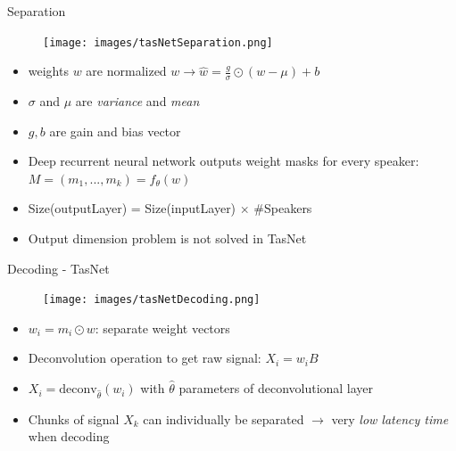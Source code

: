 \documentclass[xcolor=table,mathserif,9pt]{beamer}    %
\begin{document}
\begin{frame}{Separation}

\begin{minipage}[t]{0.48\linewidth}
	\begin{figure}[htpb]
		\centering
		\texttt{[image: images/tasNetSeparation.png]}
	\end{figure}
\end{minipage}%
\hfill%
\begin{minipage}[t]{0.48\linewidth}
	\hfill
	\begin{itemize}
		\item weights $w$ are normalized $w \to \hat{w} = \frac{g}{\sigma} \odot (w - \mu) + b$ 
		\item $\sigma$ and $\mu$ are \emph{variance} and \emph{mean}
		\item $g,b$ are gain and bias vector
		\item Deep recurrent neural network outputs weight masks for every
			speaker: $M = (m_1, ...,m_k)  = f_{\theta}(w)$
		\item Size(outputLayer) = Size(inputLayer) $\times$ $\#$Speakers
		\item Output dimension problem is not solved in TasNet
	\end{itemize}
\end{minipage}	

\end{frame}

\begin{frame}{Decoding - TasNet}

\begin{minipage}[t]{0.48\linewidth}
	\begin{figure}[htpb]
		\centering
		\texttt{[image: images/tasNetDecoding.png]}
	\end{figure}
\end{minipage}%
\hfill%
\begin{minipage}[t]{0.48\linewidth}
	\hfill
	\begin{itemize}
		\item $w_i = m_i \odot w$: separate weight vectors
		\item Deconvolution operation to get raw signal: $X_i = w_iB$ 
		\item $X_i = \text{deconv}_{\hat{\theta}}(w_i)$ with $\hat{\theta}$
			parameters of deconvolutional layer \cite{ler2010deconvolutional}
		\item Chunks of signal $X_k$ can individually be separated $\to$ 
		      very \emph{low latency time} when decoding
	\end{itemize}
\end{minipage}	

\end{frame}
\end{document}
